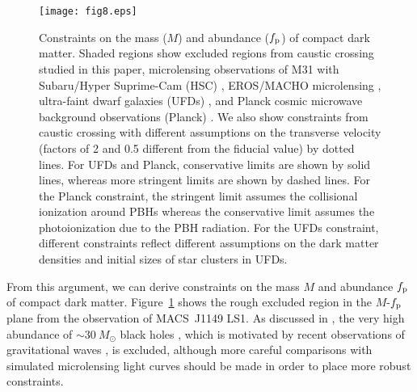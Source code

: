 \documentclass[showpacs,twocolumn,preprintnumbers,amsmath,amssymb,superscriptaddress,nofootinbib]{revtex4}
\newcommand{\morv}[1]{#1}
\begin{document}
\begin{figure}[t]
\begin{center}
\texttt{[image: fig8.eps]}
\end{center}
\caption{Constraints on the mass ($M$) and abundance ($f_{\rm p}$) of
  compact dark matter. Shaded regions show excluded regions from
  caustic crossing studied in this paper, microlensing observations of
  M31 with Subaru/Hyper Suprime-Cam (HSC) \citep{Niikura:2017zjd},
  EROS/MACHO microlensing \cite{Alcock:2000ph,Tisserand:2006zx}, 
  ultra-faint dwarf galaxies (UFDs) \cite{Brandt:2016aco}, and Planck
  cosmic microwave background observations (Planck)
  \cite{Ali-Haimoud:2016mbv}. \morv{We also show constraints from caustic
  crossing with different assumptions on the transverse velocity
  (factors of 2 and 0.5 different from the fiducial value) by dotted
  lines.} For UFDs and Planck, conservative limits
  are shown by solid lines, whereas more stringent limits are shown by
  dashed lines. \morv{For the Planck constraint, the stringent limit
    assumes the collisional ionization around PBHs whereas the
    conservative limit assumes the photoionization due to the
    PBH radiation. For the UFDs constraint, different constraints
    reflect different assumptions on the dark matter densities and
    initial sizes of star clusters in UFDs.}} 
\label{fig:pbh}
\end{figure}

From this argument, we can derive constraints on the mass $M$ and
abundance $f_{\rm p}$ of compact dark matter. Figure~\ref{fig:pbh}
shows the rough excluded region in the $M$-$f_{\rm p}$ plane from the
observation of MACS~J1149 LS1. As discussed in \cite{Kelly:2017fps},
the very high abundance of $\sim 30~M_\odot$ black holes
\citep{Bird:2016dcv}, which is motivated by recent observations of
gravitational waves \cite{Abbott:2016blz}, is excluded, although more
careful comparisons with simulated microlensing light curves should be
made in order to place more robust constraints.
\end{document}
